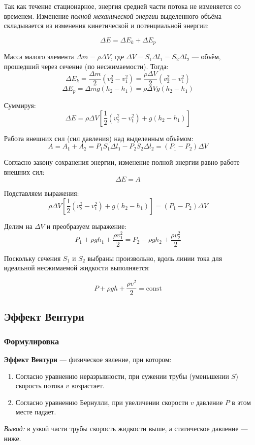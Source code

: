 Так как течение стационарное, энергия средней части потока не изменяется со временем. Изменение \textit{полной механической энергии} выделенного объёма складывается из изменения кинетической и потенциальной энергии:

\[
\Delta E = \Delta E_k + \Delta E_p
\]

Масса малого элемента $\Delta m = \rho \Delta V$, где $\Delta V = S_1 \Delta l_1 = S_2 \Delta l_2$ — объём, прошедший через сечение (по несжимаемости). Тогда:
\[
\Delta E_k = \frac{\Delta m}{2} (v_2^2 - v_1^2) = \frac{\rho \Delta V}{2} (v_2^2 - v_1^2)
\]
\[
\Delta E_p = \Delta m g (h_2 - h_1) = \rho \Delta V g (h_2 - h_1)
\]

Суммируя:
\[
\Delta E = \rho \Delta V \left[ \frac{1}{2}(v_2^2 - v_1^2) + g(h_2 - h_1) \right]
\]

Работа внешних сил (сил давления) над выделенным объёмом:
\[
A = A_1 + A_2 = P_1 S_1 \Delta l_1 - P_2 S_2 \Delta l_2 = (P_1 - P_2) \Delta V
\]

Согласно закону сохранения энергии, изменение полной энергии равно работе внешних сил:
\[
\Delta E = A
\]

Подставляем выражения:
\[
\rho \Delta V \left[ \frac{1}{2}(v_2^2 - v_1^2) + g(h_2 - h_1) \right] = (P_1 - P_2) \Delta V
\]

Делим на $\Delta V$ и преобразуем выражение:
\[
P_1 + \rho g h_1 + \frac{\rho v_1^2}{2} = P_2 + \rho g h_2 + \frac{\rho v_2^2}{2}
\]

Поскольку сечения $S_1$ и $S_2$ выбраны произвольно, вдоль линии тока для идеальной несжимаемой жидкости выполняется:

\[
\boxed{P + \rho g h + \frac{\rho v^2}{2} = \mathrm{const}}
\]

\subsection{Эффект Вентури }

\subsubsection{Формулировка}

\textbf{Эффект Вентури} --- физическое явление, при котором: 
\begin{enumerate}
    \item Согласно уравнению неразрывности, при сужении трубы (уменьшении $S$) скорость потока $v$ возрастает. 
    \item Согласно уравнению Бернулли, при увеличении скорости $v$ давление $P$ в этом месте падает. 
\end{enumerate}
\textit{Вывод:} в узкой части трубы скорость жидкости выше, а статическое давление --- ниже.

